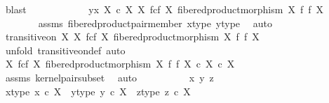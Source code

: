 \begin{isabellebody}
\ blast\isanewline
\ \ \ \ \isanewline
\ \ \ \ \isamarkupfalse%
\ \isamarkupfalse%
\ {\isachardoublequoteopen}{\isasymlangle}y{\isacharcomma}{\kern0pt}x{\isasymrangle}\ {\isasymin}\isactrlbsub X\ {\isasymtimes}\isactrlsub c\ X\isactrlesub \ {\isacharparenleft}{\kern0pt}X\ \isactrlbsub f\isactrlesub {\isasymtimes}\isactrlsub c\isactrlbsub f\isactrlesub \ X{\isacharcomma}{\kern0pt}\ fibered{\isacharunderscore}{\kern0pt}product{\isacharunderscore}{\kern0pt}morphism\ X\ f\ f\ X{\isacharparenright}{\kern0pt}{\isachardoublequoteclose}\isanewline
\ \ \ \ \ \ \isamarkupfalse%
\ assms\ fibered{\isacharunderscore}{\kern0pt}product{\isacharunderscore}{\kern0pt}pair{\isacharunderscore}{\kern0pt}member\ x{\isacharunderscore}{\kern0pt}type\ y{\isacharunderscore}{\kern0pt}type\ \isamarkupfalse%
\ auto\isanewline
\ \ \isamarkupfalse%
\isanewline
\isanewline
\ \ \isamarkupfalse%
\ {\isachardoublequoteopen}transitive{\isacharunderscore}{\kern0pt}on\ X\ {\isacharparenleft}{\kern0pt}X\ \isactrlbsub f\isactrlesub {\isasymtimes}\isactrlsub c\isactrlbsub f\isactrlesub \ X{\isacharcomma}{\kern0pt}\ fibered{\isacharunderscore}{\kern0pt}product{\isacharunderscore}{\kern0pt}morphism\ X\ f\ f\ X{\isacharparenright}{\kern0pt}{\isachardoublequoteclose}\isanewline
\ \ \isamarkupfalse%
\ {\isacharparenleft}{\kern0pt}unfold\ transitive{\isacharunderscore}{\kern0pt}on{\isacharunderscore}{\kern0pt}def{\isacharcomma}{\kern0pt}\ auto{\isacharparenright}{\kern0pt}\isanewline
\ \ \ \ \isamarkupfalse%
\ {\isachardoublequoteopen}{\isacharparenleft}{\kern0pt}X\ \isactrlbsub f\isactrlesub {\isasymtimes}\isactrlsub c\isactrlbsub f\isactrlesub \ X{\isacharcomma}{\kern0pt}\ fibered{\isacharunderscore}{\kern0pt}product{\isacharunderscore}{\kern0pt}morphism\ X\ f\ f\ X{\isacharparenright}{\kern0pt}\ {\isasymsubseteq}\isactrlsub c\ X\ {\isasymtimes}\isactrlsub c\ X{\isachardoublequoteclose}\isanewline
\ \ \ \ \ \ \isamarkupfalse%
\ assms\ kernel{\isacharunderscore}{\kern0pt}pair{\isacharunderscore}{\kern0pt}subset\ \isamarkupfalse%
\ auto\isanewline
\ \ \isamarkupfalse%
\ \isanewline
\ \ \ \ \isamarkupfalse%
\ x\ y\ z\ \isanewline
\ \ \ \ \isamarkupfalse%
\ x{\isacharunderscore}{\kern0pt}type{\isacharcolon}{\kern0pt}\ {\isachardoublequoteopen}x\ {\isasymin}\isactrlsub c\ X{\isachardoublequoteclose}\ \ y{\isacharunderscore}{\kern0pt}type{\isacharcolon}{\kern0pt}\ {\isachardoublequoteopen}y\ {\isasymin}\isactrlsub c\ X{\isachardoublequoteclose}\ \ z{\isacharunderscore}{\kern0pt}type{\isacharcolon}{\kern0pt}\ {\isachardoublequoteopen}z\ {\isasymin}\isactrlsub c\ X{\isachardoublequoteclose}\isanewline

\end{isabellebody}
